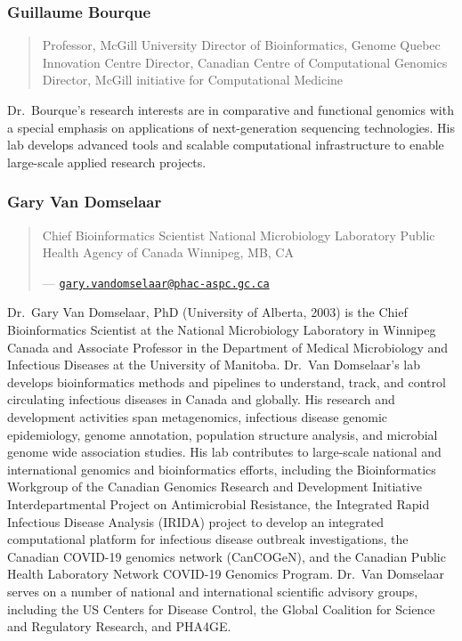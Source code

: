 \documentclass[
]{book}
\begin{document}
\subsubsection{Guillaume Bourque}\label{guillaume-bourque}

\begin{quote}
Professor, McGill University
Director of Bioinformatics, Genome Quebec Innovation Centre
Director, Canadian Centre of Computational Genomics
Director, McGill initiative for Computational Medicine
\end{quote}

Dr.~Bourque's research interests are in comparative and functional genomics with a special
emphasis on applications of next-generation sequencing technologies. His lab develops
advanced tools and scalable computational infrastructure to enable large-scale applied research
projects.

\subsubsection{Gary Van Domselaar}\label{gary-van-domselaar}

\begin{quote}
Chief Bioinformatics Scientist
National Microbiology Laboratory
Public Health Agency of Canada
Winnipeg, MB, CA

--- \href{mailto:gary.vandomselaar@phac-aspc.gc.ca}{\nolinkurl{gary.vandomselaar@phac-aspc.gc.ca}}
\end{quote}

Dr.~Gary Van Domselaar, PhD (University of Alberta, 2003) is the Chief Bioinformatics Scientist at
the National Microbiology Laboratory in Winnipeg Canada and Associate Professor in the
Department of Medical Microbiology and Infectious Diseases at the University of Manitoba. Dr.~Van
Domselaar's lab develops bioinformatics methods and pipelines to understand, track, and control
circulating infectious diseases in Canada and globally. His research and development activities span
metagenomics, infectious disease genomic epidemiology, genome annotation, population structure
analysis, and microbial genome wide association studies. His lab contributes to large-scale national
and international genomics and bioinformatics efforts, including the Bioinformatics Workgroup of the
Canadian Genomics Research and Development Initiative Interdepartmental Project on
Antimicrobial Resistance, the Integrated Rapid Infectious Disease Analysis (IRIDA) project to
develop an integrated computational platform for infectious disease outbreak investigations, the
Canadian COVID-19 genomics network (CanCOGeN), and the Canadian Public Health Laboratory
Network COVID-19 Genomics Program. Dr.~Van Domselaar serves on a number of national and
international scientific advisory groups, including the US Centers for Disease Control, the Global
Coalition for Science and Regulatory Research, and PHA4GE.
\end{document}
